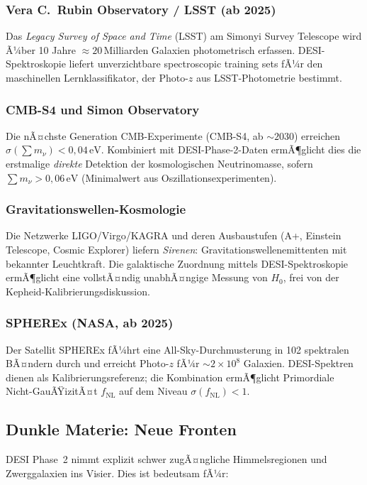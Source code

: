 ﻿\documentclass[a4paper,12pt]{article}
\theoremstyle{definition}
\theoremstyle{remark}
\begin{document}
\subsubsection*{Vera C.~Rubin Observatory / LSST (ab 2025)}
Das \textit{Legacy Survey of Space and Time} (LSST) am Simonyi Survey Telescope
wird Ã¼ber 10 Jahre $\approx 20$\,Milliarden Galaxien photometrisch erfassen.
DESI-Spektroskopie liefert unverzichtbare spectroscopic training sets fÃ¼r den
maschinellen Lernklassifikator, der Photo-$z$ aus LSST-Photometrie bestimmt.

\subsubsection*{CMB-S4 und Simon Observatory}
Die nÃ¤chste Generation CMB-Experimente (CMB-S4, ab $\sim 2030$) erreichen
$\sigma(\sum m_\nu) < 0{,}04\,\mathrm{eV}$. Kombiniert mit DESI-Phase-2-Daten
ermÃ¶glicht dies die erstmalige \textit{direkte} Detektion der kosmologischen
Neutrinomasse, sofern $\sum m_\nu > 0{,}06\,\mathrm{eV}$ (Minimalwert aus
Oszillationsexperimenten).

\subsubsection*{Gravitationswellen-Kosmologie}
Die Netzwerke LIGO/Virgo/KAGRA und deren Ausbaustufen (A+, Einstein Telescope,
Cosmic Explorer) liefern \textit{Sirenen}: Gravitationswellenemittenten mit
bekannter Leuchtkraft. Die galaktische Zuordnung mittels DESI-Spektroskopie
ermÃ¶glicht eine vollstÃ¤ndig unabhÃ¤ngige Messung von $H_0$, frei von der
Kepheid-Kalibrierungsdiskussion.

\subsubsection*{SPHEREx (NASA, ab 2025)}
Der Satellit SPHEREx fÃ¼hrt eine All-Sky-Durchmusterung in 102 spektralen BÃ¤ndern
durch und erreicht Photo-$z$ fÃ¼r $\sim 2 \times 10^8$ Galaxien. DESI-Spektren
dienen als Kalibrierungsreferenz; die Kombination ermÃ¶glicht Primordiale
Nicht-GauÃŸizitÃ¤t $f_\mathrm{NL}$ auf dem Niveau $\sigma(f_\mathrm{NL}) < 1$.

\subsection{Dunkle Materie: Neue Fronten}

DESI Phase~2 nimmt explizit schwer zugÃ¤ngliche Himmelsregionen und
Zwerggalaxien ins Visier. Dies ist bedeutsam fÃ¼r:
\end{document}
